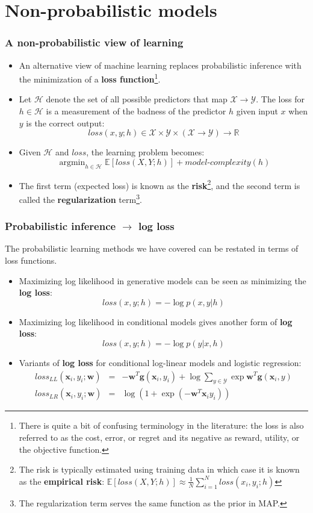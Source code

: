 \documentclass[ignorenonframetext,plain]{beamer}
\DeclareMathOperator*{\argmin}{argmin}
\newcommand{\loss}{\mathit{loss}}
\renewcommand{\vec}{\mathbf}
\begin{document}
\section{Non-probabilistic models}
\frame{\sectionpage}

\begin{frame}\frametitle{A non-probabilistic view of learning} %
\begin{itemize}
\item An alternative view of machine learning replaces probabilistic
  inference with the minimization of a {\bf loss
    function}\footnote{There is quite a bit of confusing terminology
    in the literature: the loss is also referred to as the cost,
    error, or regret and its negative as reward, utility, or the
    objective function.}.
\item Let $\mathcal{H}$ denote the set of all possible predictors that
  map $\mathcal{X}\rightarrow\mathcal{Y}$.  The loss for
  $h\in\mathcal{H}$ is a measurement of the badness of the predictor
  $h$ given input $x$ when $y$ is the correct output:
  \[ \loss(x, y; h) \in \mathcal{X} \times \mathcal{Y}
  \times (\mathcal{X}\rightarrow\mathcal{Y}) \rightarrow \mathbb{R}
\]
\item Given $\mathcal{H}$ and $\loss$, the learning problem becomes:\[
  \argmin_{h\in\mathcal{H}} \mathbb{E}[\loss(X, Y; h)] +
  \textit{model-complexity}(h)
\]
\item The first term (expected loss) is known as the {\bf
  risk}\footnote{The risk is typically estimated using training data
  in which case it is known as the {\bf empirical risk}:
  $\mathbb{E}[\loss(X, Y; h)] \approx \frac{1}{N} \sum_{i=1}^N
  \loss(x_i, y_i; h)$ }, and the second term is called the {\bf
  regularization} term\footnote{The regularization term serves the
  same function as the prior in MAP.}.
\end{itemize}
\end{frame}

\begin{frame}\frametitle{Probabilistic inference $\rightarrow$ log loss}
The probabilistic learning methods we have covered can be restated in
terms of loss functions.
\begin{itemize}
\item Maximizing log likelihood in generative models can be seen as
  minimizing the {\bf log loss}:\[
\loss(x, y; h) = -\log p(x, y | h)
\]
\item Maximizing log likelihood in conditional models gives another
  form of {\bf log loss}:\[
\loss(x, y; h) = -\log p(y | x, h)
\]
\item Variants of {\bf log loss} for conditional log-linear models and
  logistic regression: \begin{eqnarray*}
\loss_{LL}(\vec{x}_i, y_i; \vec{w}) &=& 
-\vec{w}^T \vec{g}(\vec{x}_i,y_i) 
+\log \sum_{y\in\mathcal{Y}} \exp \vec{w}^T \vec{g}(\vec{x}_i,y) \\
\loss_{LR}(\vec{x}_i, y_i; \vec{w}) &=& \log(1 + \exp(-\vec{w}^T\vec{x}_i y_i))
\end{eqnarray*}
\end{itemize}
\end{frame}
\end{document}

